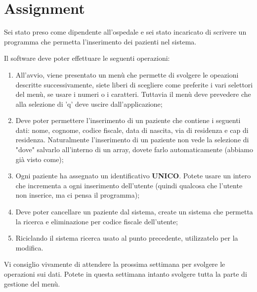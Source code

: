 \documentclass[addpoints]{exam}
\begin{document}
    \section{Assignment}
    Sei stato preso come dipendente all'ospedale e sei stato incaricato di scrivere un programma che permetta l'inserimento dei pazienti nel sistema.

    Il software deve poter effettuare le seguenti operazioni:
    \begin{enumerate}
        \item All'avvio, viene presentato un menù che permette di svolgere le opeazioni descritte successivamente, siete liberi di scegliere come preferite i vari selettori del menù, se usare i numeri o i caratteri. Tuttavia il menù deve prevedere che alla selezione di 'q' deve uscire dall'applicazione;
        \item Deve poter permettere l'inserimento di un paziente che contiene i seguenti dati: nome, cognome, codice fiscale, data di nascita, via di residenza e cap di residenza. Naturalmente l'inserimento di un paziente non vede la selezione di "dove" salvarlo all'interno di un array, dovete farlo automaticamente (abbiamo già visto come);
        \item Ogni paziente ha assegnato un identificativo \textbf{UNICO}. Potete usare un intero che incrementa a ogni inserimento dell'utente (quindi qualcosa che l'utente non inserice, ma ci pensa il programma);
        \item Deve poter cancellare un paziente dal sistema, create un sistema che permetta la ricerca e eliminazione per codice fiscale dell'utente;
        \item Riciclando il sistema ricerca usato al punto precedente, utilizzatelo per la modifica.
    \end{enumerate}

    Vi consiglio vivamente di attendere la prossima settimana per svolgere le operazioni sui dati. Potete in questa settimana intanto svolgere tutta la parte di gestione del menù.
\end{document}
